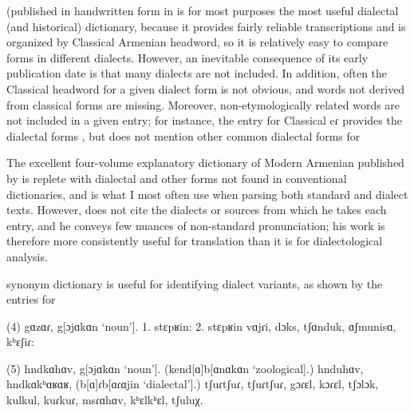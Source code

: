  (published in handwritten form in  is for most purposes the most useful dialectal (and historical) dictionary, because it provides fairly reliable transcriptions and is organized by Classical Armenian headword, so it is relatively easy to compare forms in different dialects. However, an inevitable consequence of its early publication date is that many dialects are not included. In addition, often the Classical headword for a given dialect form is not obvious, and words not derived from classical forms are missing. Moreover, non-etymologically related words are not included in a given entry; for instance, the entry for Classical eɾ  provides the dialectal forms , but does not mention other common dialectal forms for 


The excellent four-volume explanatory dictionary of Modern Armenian published by  is replete with dialectal and other forms not found in conventional dictionaries, and is what I most often use when parsing both standard and dialect texts. However,  does not cite the dialects or sources from which he takes each entry, and he conveys few nuances of non-standard pronunciation; his work is therefore more consistently useful for translation than it is for dialectological analysis.

 synonym dictionary is useful for identifying dialect variants, as shown by the entries for 

\begin{exe}
	(4)	gɑzɑɾ, g[ɔjɑkɑn ‘noun’]. 1. stɛpʁin: 2. stɛpʁin vɑjɾi, dɔks, tʃɑnduk, ɑʃmunisɑ, kʰɛʃiɾ:
	
	(5)	hndkɑhɑv, g[ɔjɑkɑn ‘noun’]. (kend[ɑ]b[ɑnɑkɑn ‘zoological].) hnduhɑv, hndkɑkʰɑʁɑʁ, (b[ɑ]ɾb[ɑɾɑjin ‘dialectal’].) tʃuɾtʃuɾ, tʃuɾtʃuɾ, gɔɾɛl, kɔɾɛl, tʃɔlɔk, kulkul, kuɾkuɾ, msɾɑhɑv, kʰɛlkʰɛl, tʃuluχ.
	
\end{exe}

